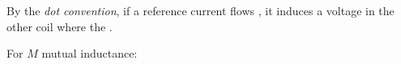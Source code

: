 \begin{multicols}{2}


    
    \begin{CheatsheetEntryFrame}


        By the \emph{dot convention}, if a reference current flows , it induces a voltage in the other coil where the .

        For $M$ mutual inductance:

        \medskip


\end{CheatsheetEntryFrame}
\end{multicols}
